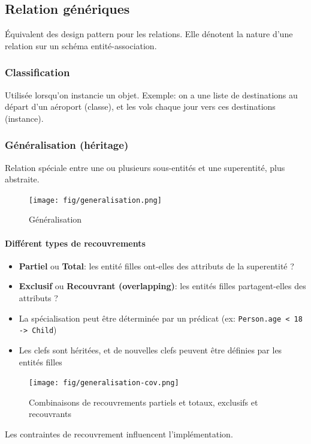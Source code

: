 \documentclass[a4paper]{article}
\begin{document}
\subsection{Relation génériques}
\'Equivalent des design pattern pour les relations. Elle dénotent la nature d'une
relation sur un schéma entité-association.

\subsubsection{Classification}
Utilisée lorsqu'on instancie un objet. Exemple: on a une liste de destinations
au départ d'un aéroport (classe), et les vols chaque jour vers ces destinations (instance).

\subsubsection{Généralisation (héritage)}
Relation spéciale entre une ou plusieurs sous-entités et une superentité, plus abstraite.

\begin{figure}[H]
    \center
    \texttt{[image: fig/generalisation.png]}
    \caption{Généralisation}
\end{figure}

\paragraph{Différent types de recouvrements}
\begin{itemize}
  \item \textbf{Partiel} ou \textbf{Total}: les entité filles ont-elles des attributs de la superentité ?
  \item \textbf{Exclusif} ou \textbf{Recouvrant (overlapping)}: les entités filles partagent-elles des attributs ?
  \item La spécialisation peut être déterminée par un prédicat (ex: \texttt{Person.age < 18 -> Child})
  \item Les clefs sont héritées, et de nouvelles clefs peuvent être définies par les entités filles
\end{itemize}
\begin{figure}[H]
    \center
    \texttt{[image: fig/generalisation-cov.png]}
    \caption{Combinaisons de recouvrements partiels et totaux, exclusifs et recouvrants}
\end{figure}

Les contraintes de recouvrement influencent l'implémentation.
\end{document}
